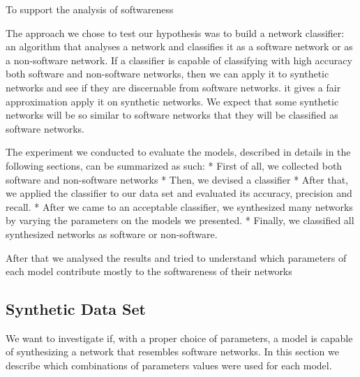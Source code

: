 To support the analysis of softwareness


The approach we chose to test our hypothesis was to build a network classifier:
an algorithm that analyses a network and classifies it as a software network or
as a non-software network. If a classifier is capable of classifying with high
accuracy both software and non-software networks, then we can apply it to
synthetic networks and see if they are discernable from software networks.
it gives a fair approximation apply it on synthetic networks. We expect that
some synthetic networks will be so similar to software networks that they will
be classified as software networks.

The experiment we conducted to evaluate the models, described in details in the
following sections, can be summarized as such:
* First of all, we collected both software and non-software networks
* Then, we devised a classifier
* After that, we applied the classifier to our data set and evaluated its
accuracy, precision and recall.
* After we came to an acceptable classifier, we synthesized many networks by
varying the parameters on the models we presented.
* Finally, we classified all synthesized networks as software or non-software.

After that we analysed the results and tried to understand which parameters
of each model contribute mostly to the softwareness of their networks


\subsection{Synthetic Data Set}

We want to investigate if, with a proper choice of parameters, a model is
capable of synthesizing a network that resembles software networks. In this
section we describe which combinations of parameters values were used for each
model.

